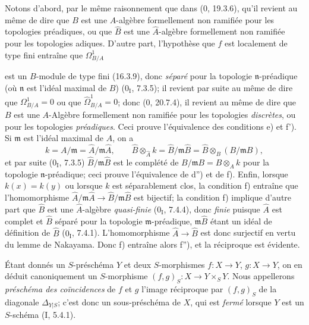 Notons d'abord, par le même raisonnement que dans (0, 19.3.6), qu'il revient au même de dire que $B$ est une $A$-algèbre formellement non ramifiée pour les topologies préadiques, ou que $\widehat{B}$ est une $\widehat{A}$-algèbre formellement non ramifiée pour les topologies adiques. D'autre part, l'hypothèse que $f$ est localement de type fini entraîne que $\Omega^1_{B/A}$

est un $B$-module de type fini (16.3.9), donc \emph{séparé} pour la topologie $\mathfrak n$-préadique (où $\mathfrak n$ est l'idéal maximal de $B$) ($0_{\mathrm I}$, 7.3.5); il revient par suite au même de dire que $\Omega^1_{B/A}=0$ ou que $\widehat{\Omega}^1_{B/A}=0$; donc (0, 20.7.4), il revient au même de dire que $B$ est une $A$-Algèbre formellement non ramifiée pour les topologies \emph{discrètes}, ou pour les topologies \emph{préadiques}. Ceci prouve l'équivalence des conditions e) et f'). Si $\mathfrak m$ est l'idéal maximal de $A$, on a
\[
k=A/\mathfrak m=\widehat A/\mathfrak m\widehat A,
\qquad
\widehat B\otimes_{\widehat A}k=\widehat B/\mathfrak m\widehat B
=\widehat B\otimes_B(B/\mathfrak m B),
\]
et par suite ($0_{\mathrm I}$, 7.3.5) $\widehat B/\mathfrak m\widehat B$ est le complété de $B/\mathfrak m B=B\otimes_A k$ pour la topologie $\mathfrak n$-préadique; ceci prouve l'équivalence de d'') et de f). Enfin, lorsque $k(x)=k(y)$ ou lorsque $k$ est séparablement clos, la condition f) entraîne que l'homomorphisme $\widehat A/\mathfrak m\widehat A\to\widehat B/\mathfrak m\widehat B$ est bijectif; la condition f) implique d'autre part que $\widehat B$ est une $\widehat A$-algèbre \emph{quasi-finie} ($0_{\mathrm I}$, 7.4.4), donc \emph{finie} puisque $\widehat A$ est complet et $\widehat B$ séparé pour la topologie $\mathfrak m$-préadique, $\mathfrak m\widehat B$ étant un idéal de définition de $\widehat B$ ($0_{\mathrm I}$, 7.4.1). L'homomorphisme $\widehat A\to\widehat B$ est donc surjectif en vertu du lemme de Nakayama. Donc f) entraîne alors f''), et la réciproque est évidente.

\begin{env}[17.4.5]
\label{IV.17.4.5}
Étant donnés un $S$-préschéma $Y$ et deux $S$-morphismes $f:X\to Y$, $g:X\to Y$, on en déduit canoniquement un $S$-morphisme $(f,g)_S:X\to Y\times_S Y$. Nous appellerons \emph{préschéma des coïncidences} de $f$ et $g$ l'image réciproque par $(f,g)_S$ de la diagonale $\Delta_{Y|S}$; c'est donc un sous-préschéma de $X$, qui est \emph{fermé} lorsque $Y$ est un $S$-schéma (I, 5.4.1).
\end{env}

